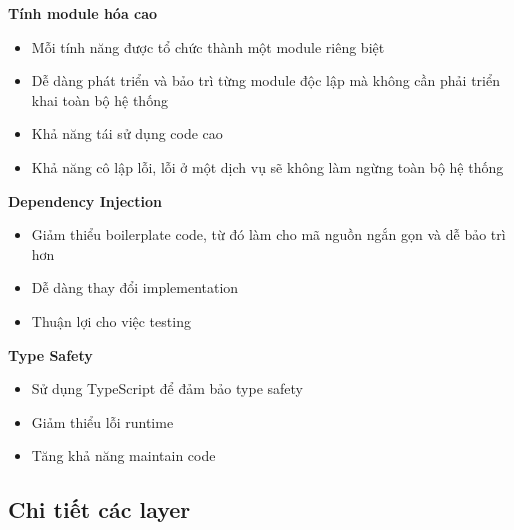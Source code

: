 \begin{description}
    \item \textbf{Tính module hóa cao}
          \begin{itemize}
              \item Mỗi tính năng được tổ chức thành một module riêng biệt
              \item Dễ dàng phát triển và bảo trì từng module độc lập mà không cần phải
                    triển khai toàn bộ hệ thống
              \item Khả năng tái sử dụng code cao
              \item Khả năng cô lập lỗi, lỗi ở một dịch vụ sẽ không làm ngừng toàn bộ hệ
                    thống
          \end{itemize}

    \item \textbf{Dependency Injection}
          \begin{itemize}
              \item Giảm thiểu boilerplate code, từ đó làm cho mã nguồn ngắn gọn và dễ
                    bảo trì hơn
              \item Dễ dàng thay đổi implementation
              \item Thuận lợi cho việc testing
          \end{itemize}

    \item \textbf{Type Safety}
          \begin{itemize}
              \item Sử dụng TypeScript để đảm bảo type safety
              \item Giảm thiểu lỗi runtime
              \item Tăng khả năng maintain code
          \end{itemize}
\end{description}

\subsection{Chi tiết các layer}

